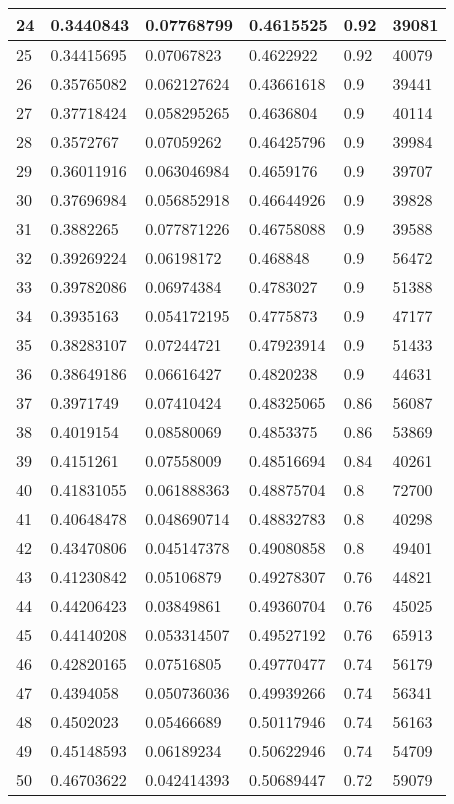 \begin{longtable}{|l|l|l|l|l|l|}
24 & 0.3440843 & 0.07768799 & 0.4615525 & 0.92 & 39081 \\ \hline 
25 & 0.34415695 & 0.07067823 & 0.4622922 & 0.92 & 40079 \\ \hline 
26 & 0.35765082 & 0.062127624 & 0.43661618 & 0.9 & 39441 \\ \hline 
27 & 0.37718424 & 0.058295265 & 0.4636804 & 0.9 & 40114 \\ \hline 
28 & 0.3572767 & 0.07059262 & 0.46425796 & 0.9 & 39984 \\ \hline 
29 & 0.36011916 & 0.063046984 & 0.4659176 & 0.9 & 39707 \\ \hline 
30 & 0.37696984 & 0.056852918 & 0.46644926 & 0.9 & 39828 \\ \hline 
31 & 0.3882265 & 0.077871226 & 0.46758088 & 0.9 & 39588 \\ \hline 
32 & 0.39269224 & 0.06198172 & 0.468848 & 0.9 & 56472 \\ \hline 
33 & 0.39782086 & 0.06974384 & 0.4783027 & 0.9 & 51388 \\ \hline 
34 & 0.3935163 & 0.054172195 & 0.4775873 & 0.9 & 47177 \\ \hline 
35 & 0.38283107 & 0.07244721 & 0.47923914 & 0.9 & 51433 \\ \hline 
36 & 0.38649186 & 0.06616427 & 0.4820238 & 0.9 & 44631 \\ \hline 
37 & 0.3971749 & 0.07410424 & 0.48325065 & 0.86 & 56087 \\ \hline 
38 & 0.4019154 & 0.08580069 & 0.4853375 & 0.86 & 53869 \\ \hline 
39 & 0.4151261 & 0.07558009 & 0.48516694 & 0.84 & 40261 \\ \hline 
40 & 0.41831055 & 0.061888363 & 0.48875704 & 0.8 & 72700 \\ \hline 
41 & 0.40648478 & 0.048690714 & 0.48832783 & 0.8 & 40298 \\ \hline 
42 & 0.43470806 & 0.045147378 & 0.49080858 & 0.8 & 49401 \\ \hline 
43 & 0.41230842 & 0.05106879 & 0.49278307 & 0.76 & 44821 \\ \hline 
44 & 0.44206423 & 0.03849861 & 0.49360704 & 0.76 & 45025 \\ \hline 
45 & 0.44140208 & 0.053314507 & 0.49527192 & 0.76 & 65913 \\ \hline 
46 & 0.42820165 & 0.07516805 & 0.49770477 & 0.74 & 56179 \\ \hline 
47 & 0.4394058 & 0.050736036 & 0.49939266 & 0.74 & 56341 \\ \hline 
48 & 0.4502023 & 0.05466689 & 0.50117946 & 0.74 & 56163 \\ \hline 
49 & 0.45148593 & 0.06189234 & 0.50622946 & 0.74 & 54709 \\ \hline 
50 & 0.46703622 & 0.042414393 & 0.50689447 & 0.72 & 59079 \\ \hline 
\end{longtable}